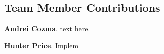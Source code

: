 \appendix
\subsection{Team Member Contributions}

\textbf{Andrei Cozma}. text here.


\textbf{Hunter Price}. Implem


